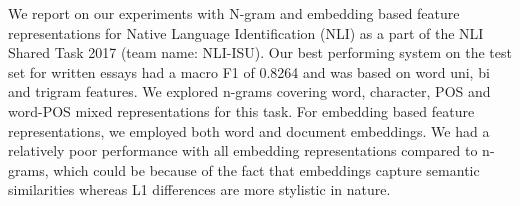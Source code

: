 We report on our experiments with N-gram and embedding based feature representations for Native Language Identification (NLI) as a part of the NLI Shared Task 2017 (team name: NLI-ISU). Our best performing system on the test set for written essays had a macro F1 of 0.8264 and was based on word uni, bi and trigram features. We explored n-grams covering word, character, POS and word-POS mixed representations for this task. For embedding based feature representations, we employed both word and document embeddings. We had a relatively poor performance with all embedding representations compared to n-grams, which could be because of the fact that embeddings capture semantic similarities whereas L1 differences are more stylistic in nature.
